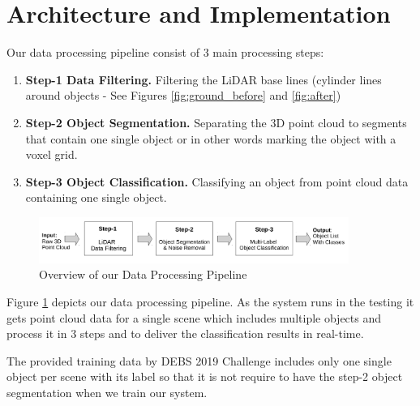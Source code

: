 \section{Architecture and Implementation}\label{sec:Architecture}

Our data processing pipeline consist of 3 main processing steps: 

\begin{enumerate}
  \item \textbf{Step-1 Data Filtering. } Filtering the LiDAR base lines (cylinder lines around objects - See Figures \ref{fig:ground_before} and \ref{fig:after})
  
  \item \textbf{Step-2 Object Segmentation.} Separating the 3D point cloud to segments that contain one single object or in other words marking the object with a voxel grid.
    
  \item \textbf{Step-3 Object Classification.}  Classifying an object from point cloud data containing one single object.
\end{enumerate}

\begin{figure}[!h]
 \begin{center}
   \includegraphics[width=0.9\textwidth]{./images/DataProcessingPipleline.pdf}
   \caption{Overview of our Data Processing Pipeline}
   \label{fig:dataPipeline}
 \end{center}
\end{figure}


Figure \ref{fig:dataPipeline} depicts our data processing pipeline. As the system runs in the testing it gets point cloud data for a single scene which includes multiple objects and process it in 3 steps and to deliver the classification results in real-time.   

The provided training data by DEBS 2019 Challenge \cite{DEBSGC2019} includes only one single object per scene with its label so that it is not require to have the step-2 object segmentation when we train our system.






